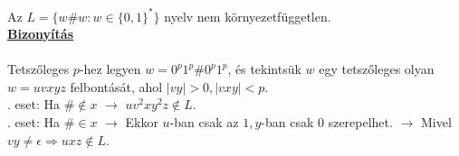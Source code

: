 \begin{frame}
\begin{tcolorbox}[title={Tétel: Példa nem környezetfüggetlen nyelvre 2}]
Az $L = \{w\#w : w \in \{0, 1\}^* \}$ nyelv nem környezetfüggetlen.\\
\tcblower
\msmallskip
\underline{\textbf{Bizonyítás}}\\
\mmedskip
\\
Tetszőleges $p$-hez legyen $w = 0^p1^p\#0^p1^p$, és tekintsük $w$ egy tetszőleges olyan $w = uvxyz$ felbontását, ahol $|vy| > 0, |vxy| < p$.\\
. eset: Ha $\# \notin x$ $\rightarrow$ $uv^2xy^2z \notin L$.\\
. eset: Ha $\# \in x$ $\rightarrow$ Ekkor $u$-ban csak az $1, y$-ban csak $0$ szerepelhet. $\rightarrow$ Mivel $vy \neq \epsilon \Rightarrow uxz \notin L$.
\end{tcolorbox}
\end{frame}


